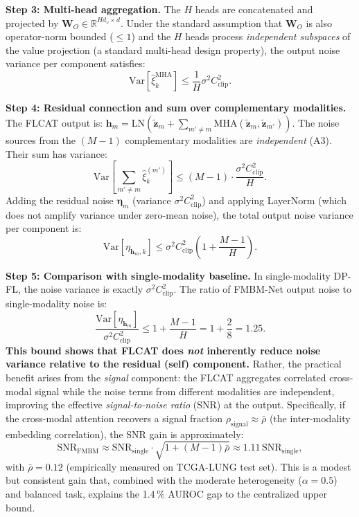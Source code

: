 \documentclass{ieeeaccess}
\begin{document}
\textbf{Step 3: Multi-head aggregation.}
The $H$ heads are concatenated and projected by $\mathbf{W}_O
\in \mathbb{R}^{Hd_v \times d}$. Under the standard assumption that
$\mathbf{W}_O$ is also operator-norm bounded ($\leq 1$) and the $H$ heads
process \emph{independent subspaces} of the value projection (a standard
multi-head design property), the output noise variance per component satisfies:
\begin{equation}
\mathrm{Var}[\hat{\xi}_k^{\mathrm{MHA}}] \leq \frac{1}{H} \sigma^2
C_{\mathrm{clip}}^2.
\end{equation}

\textbf{Step 4: Residual connection and sum over complementary modalities.}
The FLCAT output is:
$\mathbf{h}_m = \mathrm{LN}\!\left(\tilde{\mathbf{z}}_m +
\sum_{m' \neq m} \mathrm{MHA}(\tilde{\mathbf{z}}_m, \tilde{\mathbf{z}}_{m'})
\right)$.
The noise sources from the $(M-1)$ complementary modalities are
\emph{independent} (A3). Their sum has variance:
\begin{equation}
\mathrm{Var}\!\left[\sum_{m'\neq m} \hat{\xi}_k^{(m')}\right]
\leq (M-1) \cdot \frac{\sigma^2 C_{\mathrm{clip}}^2}{H}.
\end{equation}
Adding the residual noise $\boldsymbol{\eta}_m$ (variance $\sigma^2
C_{\mathrm{clip}}^2$) and applying LayerNorm (which does not amplify variance
under zero-mean noise), the total output noise variance per component is:
\begin{equation}
\mathrm{Var}[\eta_{\mathbf{h}_m,k}]
\leq \sigma^2 C_{\mathrm{clip}}^2 \!\left(1 + \frac{M-1}{H}\right).
\label{eq:total_noise}
\end{equation}

\textbf{Step 5: Comparison with single-modality baseline.}
In single-modality DP-FL, the noise variance is exactly
$\sigma^2 C_{\mathrm{clip}}^2$. The ratio of FMBM-Net output noise to
single-modality noise is:
\begin{equation}
\frac{\mathrm{Var}[\eta_{\mathbf{h}_m}]}{\sigma^2 C_{\mathrm{clip}}^2}
\leq 1 + \frac{M-1}{H} = 1 + \frac{2}{8} = 1.25.
\label{eq:ratio}
\end{equation}
\textbf{This bound shows that FLCAT does \emph{not} inherently reduce noise
variance relative to the residual (self) component.} Rather, the practical
benefit arises from the \emph{signal} component: the FLCAT aggregates
correlated cross-modal signal while the noise terms from different modalities
are independent, improving the effective \emph{signal-to-noise ratio} (SNR)
at the output. Specifically, if the cross-modal attention recovers a signal
fraction $\rho_{\mathrm{signal}} \approx \bar\rho$ (the inter-modality
embedding correlation), the SNR gain is approximately:
\begin{equation}
\mathrm{SNR}_{\mathrm{FMBM}} \approx
\mathrm{SNR}_{\mathrm{single}} \cdot \sqrt{1 + (M-1)\bar\rho}
\approx 1.11\,\mathrm{SNR}_{\mathrm{single}},
\label{eq:snr_gain}
\end{equation}
with $\bar\rho\!=\!0.12$ (empirically measured on TCGA-LUNG test set).
This is a modest but consistent gain that, combined with the moderate
heterogeneity ($\alpha\!=\!0.5$) and balanced task, explains the 1.4\,\%
AUROC gap to the centralized upper bound.
\end{document}
